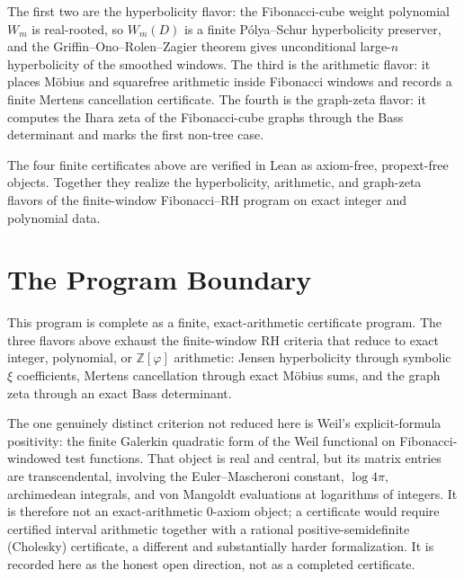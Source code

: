 The first two are the hyperbolicity flavor: the Fibonacci-cube weight polynomial $W_m$ is real-rooted, so $W_m(D)$ is a finite P\'olya--Schur hyperbolicity preserver, and the Griffin--Ono--Rolen--Zagier theorem gives unconditional large-$n$ hyperbolicity of the smoothed windows. The third is the arithmetic flavor: it places M\"obius and squarefree arithmetic inside Fibonacci windows and records a finite Mertens cancellation certificate. The fourth is the graph-zeta flavor: it computes the Ihara zeta of the Fibonacci-cube graphs through the Bass determinant and marks the first non-tree case.

\begin{theorem}
\label{thm:fib-rh-program-summary}
The four finite certificates above are verified in Lean as axiom-free, propext-free objects. Together they realize the hyperbolicity, arithmetic, and graph-zeta flavors of the finite-window Fibonacci--RH program on exact integer and polynomial data.
\end{theorem}

\section{The Program Boundary}
\label{sec:fib-rh-program-boundary}

This program is complete as a finite, exact-arithmetic certificate program. The three flavors above exhaust the finite-window RH criteria that reduce to exact integer, polynomial, or $\mathbb Z[\varphi]$ arithmetic: Jensen hyperbolicity through symbolic $\xi$ coefficients, Mertens cancellation through exact M\"obius sums, and the graph zeta through an exact Bass determinant.

The one genuinely distinct criterion not reduced here is Weil's explicit-formula positivity: the finite Galerkin quadratic form of the Weil functional on Fibonacci-windowed test functions. That object is real and central, but its matrix entries are transcendental, involving the Euler--Mascheroni constant, $\log 4\pi$, archimedean integrals, and von Mangoldt evaluations at logarithms of integers. It is therefore not an exact-arithmetic $0$-axiom object; a certificate would require certified interval arithmetic together with a rational positive-semidefinite (Cholesky) certificate, a different and substantially harder formalization. It is recorded here as the honest open direction, not as a completed certificate.

